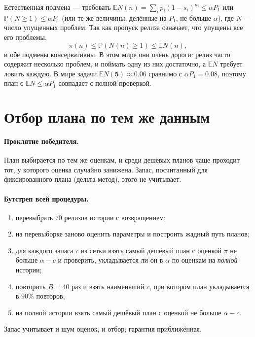 \documentclass[11pt,a4paper]{article}
\newcommand{\E}{\mathbb{E}}
\newcommand{\Prob}{\mathbb{P}}
\theoremstyle{plain}
\theoremstyle{definition}
\begin{document}
Естественная подмена --- требовать $\E N(n)=\sum_ip_i(1-s_i)^{n_i}\le\alpha P_1$ или $\Prob(N\ge1)\le\alpha P_1$ (или те же величины, делённые на $P_1$, не больше $\alpha$), где $N$ --- число упущенных проблем. Так как пропуск релиза означает, что упущены все его проблемы,
\[
\pi(n)\le\Prob(N(n)\ge1)\le\E N(n),
\]
и обе подмены консервативны. В этом мире они очень дороги: релиз часто содержит несколько проблем, и поймать одну из них достаточно, а $\E N$ требует ловить каждую. В мире задачи $\E N(\mathbf5)\approx0.06$ сравнимо с $\alpha P_1=0.08$, поэтому план с $\E N\le\alpha P_1$ совпадает с полной проверкой.

\section{Отбор плана по тем же данным}

\paragraph{Проклятие победителя.} План выбирается по тем же оценкам, и среди дешёвых планов чаще проходит тот, у которого оценка случайно занижена. Запас, посчитанный для фиксированного плана (дельта-метод), этого не учитывает.

\paragraph{Бутстреп всей процедуры.}
\begin{enumerate}
\item перевыбрать $70$ релизов истории с возвращением;
\item на перевыборке заново оценить параметры и построить жадный путь планов;
\item для каждого запаса $c$ из сетки взять самый дешёвый план с оценкой $\pi$ не больше $\alpha-c$ и проверить, укладывается ли он в $\alpha$ по оценкам на \emph{полной} истории;
\item повторить $B=40$ раз и взять наименьший $c$, при котором план укладывается в $90\%$ повторов;
\item на полной истории взять самый дешёвый план с оценкой не больше $\alpha-c$.
\end{enumerate}
Запас учитывает и шум оценок, и отбор; гарантия приближённая.
\end{document}

